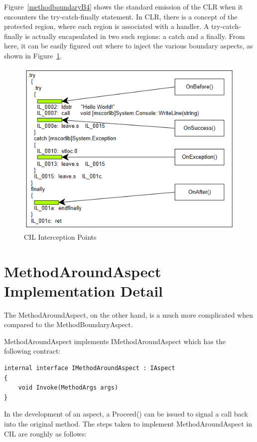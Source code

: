 Figure~\ref{methodboundaryB4} shows the standard emission of the CLR when it encounters the try-catch-finally statement. In CLR, there is a concept of the protected region, where each region is associated with a handler. A try-catch-finally is actually encapsulated in two such regions: a catch and a finally. From here, it can be easily figured out where to inject the various boundary aspects, as shown in Figure~\ref{methodboundary02}.

\begin{figure}[H]
  \includegraphics[scale=1.0]{MethodBoundaryOverview.PNG}
  \centering
  \caption{CIL Interception Points\label{methodboundary02}}
\end{figure}

\section{MethodAroundAspect Implementation Detail}

The MethodAroundAspect, on the other hand, is a much more complicated when compared to the MethodBoundaryAspect.

MethodAroundAspect implements IMethodAroundAspect which has the following contract:

\begin{lstlisting}[caption={IMethodAroundAspect Interface}, label=aroundcontract]
internal interface IMethodAroundAspect : IAspect
{
	void Invoke(MethodArgs args)
}
\end{lstlisting}

In the development of an aspect, a Proceed() can be issued to signal a call back into the original method. The steps taken to implement MethodAroundAspect in CIL are roughly as follows:

